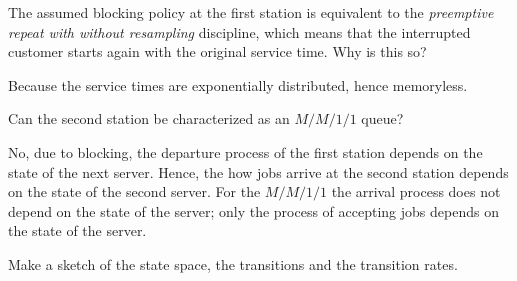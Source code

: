 \begin{exercise}[201706]
  The assumed blocking  policy at the first station is equivalent to the \emph{preemptive repeat with without resampling} discipline, which means that the interrupted customer starts again with the original service time. Why is this so? 
\begin{solution}
  Because the service times are exponentially distributed, hence memoryless. 
\end{solution}
\end{exercise}


\begin{exercise}[201706]
  Can the second station be characterized as an $M/M/1/1$ queue? 
\begin{solution}
    No, due to blocking, the departure process of the first station depends on the state of the next server. Hence, the how  jobs arrive at the second station depends on the state of the second server. For the $M/M/1/1$ the arrival process does not depend on the state of the server; only the process of accepting jobs depends on the state of the server.  
\end{solution}
\end{exercise}


\begin{exercise}[201706]{2}
Make a sketch of the state space,  the transitions and the transition rates.
\begin{solution}
  \begin{center}
    
  \end{center}
\end{solution}
\end{exercise}


